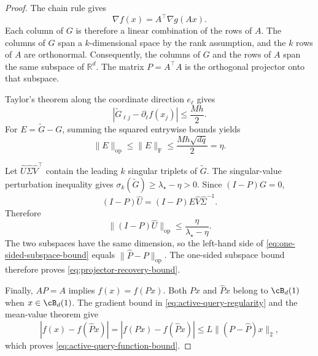 \documentclass[11pt,twoside]{article}
\newcommand{\R}{\mathbb R}
\theoremstyle{definition}
\theoremstyle{remark}
\begin{document}
\begin{proof}
The chain rule gives
\begin{equation}
 \nabla f(x)=A^\top\nabla g(Ax).
 \label{eq:appendix-gradient-factorization}
\end{equation}
Each column of $G$ is therefore a linear combination of the rows of $A$.
The columns of $G$ span a $k$-dimensional space by the rank assumption, and
the $k$ rows of $A$ are orthonormal. Consequently, the columns of $G$ and the
rows of $A$ span the same subspace of $\R^d$. The matrix $P=A^\top A$ is the
orthogonal projector onto that subspace.

Taylor's theorem along the coordinate direction $e_\ell$ gives
\begin{equation}
 \left|\widetilde G_{\ell j}-\partial_\ell f(x_j)\right|
 \leq \frac{Mh}{2}.
 \label{eq:coordinate-difference-error}
\end{equation}
For $E=\widetilde G-G$, summing the squared entrywise bounds yields
\begin{equation}
 \|E\|_{\mathrm{op}}
 \leq\|E\|_{\mathrm F}
 \leq\frac{Mh\sqrt{dq}}2=\eta.
 \label{eq:gradient-matrix-perturbation}
\end{equation}

Let $\widehat U\widehat\Sigma\widehat V^\top$ contain the leading $k$
singular triplets of $\widetilde G$. The singular-value perturbation
inequality gives
$\sigma_k(\widetilde G)\geq\lambda_\star-\eta>0$. Since
$(I-P)G=0$,
\begin{equation}
 (I-P)\widehat U
 =(I-P)E\widehat V\widehat\Sigma^{-1}.
 \label{eq:subspace-perturbation-identity}
\end{equation}
Therefore
\begin{equation}
 \|(I-P)\widehat U\|_{\mathrm{op}}
 \leq\frac{\eta}{\lambda_\star-\eta}.
 \label{eq:one-sided-subspace-bound}
\end{equation}
The two subspaces have the same dimension, so the left-hand side of
\cref{eq:one-sided-subspace-bound} equals
$\|\widehat P-P\|_{\mathrm{op}}$. The one-sided subspace bound therefore
proves \cref{eq:projector-recovery-bound}.

Finally, $AP=A$ implies $f(x)=f(Px)$. Both $Px$ and $\widehat Px$ belong to
$\cB_d(1)$ when $x\in\cB_d(1)$. The gradient bound in
\cref{eq:active-query-regularity} and the mean-value theorem give
\[
 |f(x)-f(\widehat Px)|
 =|f(Px)-f(\widehat Px)|
 \leq L\|(P-\widehat P)x\|_2,
\]
which proves \cref{eq:active-query-function-bound}.
\end{proof}
\end{document}
